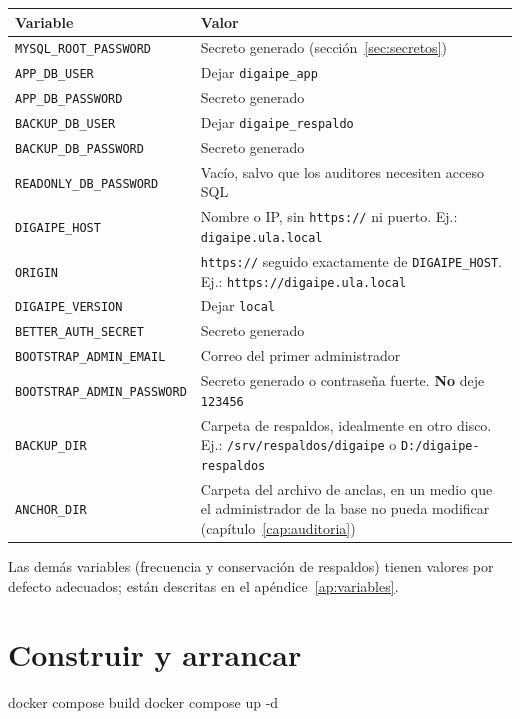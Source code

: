 \begin{xltabular}{\linewidth}{@{}l L@{}}
	\toprule
	\textbf{Variable} & \textbf{Valor} \\
	\midrule
	\endhead
	\texttt{MYSQL\_ROOT\_PASSWORD} & Secreto generado (sección~\ref{sec:secretos}) \\
	\texttt{APP\_DB\_USER} & Dejar \texttt{digaipe\_app} \\
	\texttt{APP\_DB\_PASSWORD} & Secreto generado \\
	\texttt{BACKUP\_DB\_USER} & Dejar \texttt{digaipe\_respaldo} \\
	\texttt{BACKUP\_DB\_PASSWORD} & Secreto generado \\
	\texttt{READONLY\_DB\_PASSWORD} & Vacío, salvo que los auditores necesiten acceso SQL \\
	\texttt{DIGAIPE\_HOST} & Nombre o IP, sin \texttt{https://} ni puerto. Ej.:
	\texttt{digaipe.ula.local} \\
	\texttt{ORIGIN} & \texttt{https://} seguido exactamente de \texttt{DIGAIPE\_HOST}. Ej.:
	\texttt{https://digaipe.ula.local} \\
	\texttt{DIGAIPE\_VERSION} & Dejar \texttt{local} \\
	\texttt{BETTER\_AUTH\_SECRET} & Secreto generado \\
	\texttt{BOOTSTRAP\_ADMIN\_EMAIL} & Correo del primer administrador \\
	\texttt{BOOTSTRAP\_ADMIN\_PASSWORD} & Secreto generado o contraseña fuerte. \textbf{No} deje
	\texttt{123456} \\
	\texttt{BACKUP\_DIR} & Carpeta de respaldos, idealmente en otro disco. Ej.:
	\texttt{/srv/respaldos/digaipe} o \texttt{D:/digaipe-respaldos} \\
	\texttt{ANCHOR\_DIR} & Carpeta del archivo de anclas, en un medio que el administrador de la
	base no pueda modificar (capítulo~\ref{cap:auditoria}) \\
	\bottomrule
\end{xltabular}

Las demás variables (frecuencia y conservación de respaldos) tienen valores por defecto
adecuados; están descritas en el apéndice~\ref{ap:variables}.

\section{Construir y arrancar}

\begin{codigo}
docker compose build
docker compose up -d
\end{codigo}

